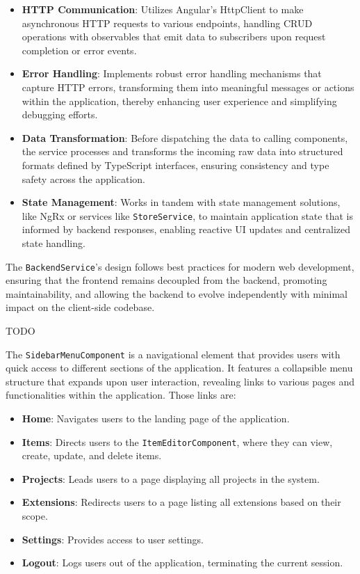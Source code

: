 \begin{itemize}
    \item \textbf{HTTP Communication}: Utilizes Angular's HttpClient to make asynchronous HTTP requests to various endpoints, handling CRUD operations with observables that emit data to subscribers upon request completion or error events.
    \item \textbf{Error Handling}: Implements robust error handling mechanisms that capture HTTP errors, transforming them into meaningful messages or actions within the application, thereby enhancing user experience and simplifying debugging efforts.
    \item \textbf{Data Transformation}: Before dispatching the data to calling components, the service processes and transforms the incoming raw data into structured formats defined by TypeScript interfaces, ensuring consistency and type safety across the application.
    \item \textbf{State Management}: Works in tandem with state management solutions, like NgRx or services like \texttt{StoreService}, to maintain application state that is informed by backend responses, enabling reactive UI updates and centralized state handling.
\end{itemize}

The \texttt{BackendService}'s design follows best practices for modern web development, ensuring that the frontend remains decoupled from the backend, promoting maintainability, and allowing the backend to evolve independently with minimal impact on the client-side codebase.

TODO

The \texttt{SidebarMenuComponent} is a navigational element that provides users with quick access to different sections of the application.
It features a collapsible menu structure that expands upon user interaction, revealing links to various pages and functionalities within the application.
Those links are:

\begin{itemize}
    \item \textbf{Home}: Navigates users to the landing page of the application.
    \item \textbf{Items}: Directs users to the \texttt{ItemEditorComponent}, where they can view, create, update, and delete items.
    \item \textbf{Projects}: Leads users to a page displaying all projects in the system.
    \item \textbf{Extensions}: Redirects users to a page listing all extensions based on their scope.
    \item \textbf{Settings}: Provides access to user settings.
    \item \textbf{Logout}: Logs users out of the application, terminating the current session.
\end{itemize}


